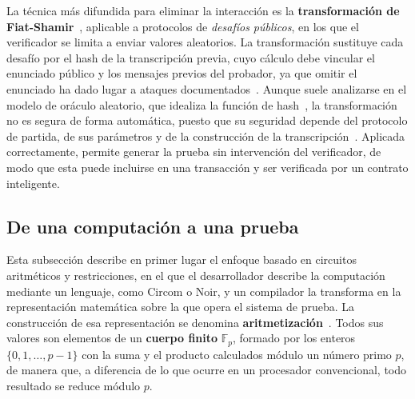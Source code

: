 La técnica más difundida para eliminar la interacción es la \textbf{transformación de
Fiat-Shamir}~\cite{fiat1987prove}, aplicable a protocolos de \textit{desafíos públicos}, en los
que el verificador se limita a enviar valores aleatorios. La transformación sustituye cada
desafío por el hash de la transcripción previa, cuyo cálculo debe vincular el enunciado público
y los mensajes previos del probador, ya que omitir el enunciado ha dado lugar a ataques
documentados~\cite{bernhard2012pitfalls}. Aunque suele analizarse en el modelo de oráculo
aleatorio, que idealiza la función de hash~\cite{bellare1993random}, la transformación no es
segura de forma automática, puesto que su seguridad depende del protocolo de partida, de sus
parámetros y de la construcción de la transcripción~\cite[Sección~5.3]{thaler2022proofs}.
Aplicada correctamente, permite generar la prueba sin intervención del verificador, de modo que
esta puede incluirse en una transacción y ser verificada por un contrato inteligente.
\subsection{De una computación a una prueba}
\label{sec:computacion_prueba}

Esta subsección describe en primer lugar el enfoque basado en circuitos aritméticos y
restricciones, en el que el desarrollador describe la computación mediante un lenguaje, como
Circom o Noir, y un compilador la transforma en la representación matemática sobre la que opera el
sistema de prueba. La construcción de esa representación se denomina
\textbf{aritmetización}~\cite{thaler2022proofs}. Todos sus valores son elementos de un
\textbf{cuerpo finito} $\mathbb{F}_p$, formado por los enteros $\{0, 1, \dots, p - 1\}$ con la
suma y el producto calculados módulo un número primo $p$, de manera que, a diferencia de lo que
ocurre en un procesador convencional, todo resultado se reduce módulo $p$.

